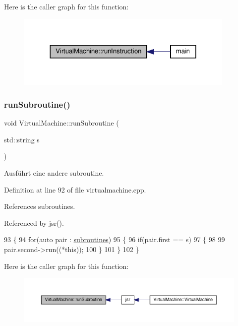 Here is the caller graph for this function\+:
\nopagebreak
\begin{figure}[H]
\begin{center}
\leavevmode
\includegraphics[width=300pt]{class_virtual_machine_aabeb8078a57ca3bb98c24bc655296e9f_icgraph}
\end{center}
\end{figure}
\mbox{\label{class_virtual_machine_a564ba72b2d0f9e888a1560b523c567ba}} 
\subsubsection{\texorpdfstring{run\+Subroutine()}{runSubroutine()}}
{\footnotesize\ttfamily void Virtual\+Machine\+::run\+Subroutine (\begin{DoxyParamCaption}\item[{std\+::string}]{s }\end{DoxyParamCaption})}

Ausführt eine andere subroutine. 

Definition at line 92 of file virtualmachine.\+cpp.



References subroutines.



Referenced by jsr().


\begin{DoxyCode}
93 \{
94     \textcolor{keywordflow}{for}(\textcolor{keyword}{auto} pair : \mbox{\hyperlink{class_virtual_machine_a91f5b9cfc45eaea5ce95b659705b2803}{subroutines}})
95     \{
96         \textcolor{keywordflow}{if}(pair.first == s)
97         \{
98             
99             pair.second->run((*\textcolor{keyword}{this}));
100         \}
101     \}
102 \}
\end{DoxyCode}
Here is the caller graph for this function\+:
\nopagebreak
\begin{figure}[H]
\begin{center}
\leavevmode
\includegraphics[width=350pt]{class_virtual_machine_a564ba72b2d0f9e888a1560b523c567ba_icgraph}
\end{center}
\end{figure}


